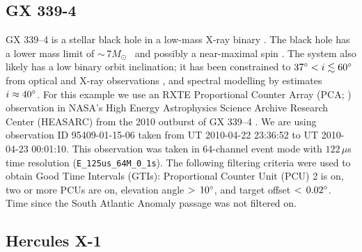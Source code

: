 \documentclass[twocolumn]{aastex62}
\newcommand{\Msun}{\ensuremath{M_\odot}\xspace}
\begin{document}
\subsection{GX 339-4}
\label{sec:gx339}
GX 339--4 is a stellar black hole in a low-mass X-ray binary \citep{Hynesetal03}. 
The black hole has a lower mass limit of $\sim$\,7\Msun\ \citep{MunozDariasetal08} and possibly a near-maximal spin \citep{Ludlametal15}. 
The system also likely has a low binary orbit inclination; it has been constrained to $37 \degree <i\lesssim 60\degree$ from optical and X-ray observations \citep{Heidaetal17, Zdziarskietal98}, and spectral modelling by \citet{WangJietal18} estimates $i\approx 40\degree$.
For this example we use an RXTE Proportional Counter Array (PCA; \citealt{Jahodaetal96}) observation in NASA's High Energy Astrophysics Science Archive Research Center (HEASARC) from the 2010 outburst of GX 339--4 \citep{Yamaokaetal10}.
We are using observation ID 95409-01-15-06 taken from UT 2010-04-22 23:36:52 to UT 2010-04-23 00:01:10.
This observation was taken in 64-channel event mode with $122\,\mu$s time resolution (\texttt{E\_125us\_64M\_0\_1s}).
The following filtering criteria were used to obtain Good Time Intervals (GTIs): Proportional Counter Unit (PCU) 2 is on, two or more PCUs are on, elevation angle $>\,10\degree$, and target offset $<\,0.02\degree$. 
Time since the South Atlantic Anomaly passage was not filtered on. 

\subsection{Hercules X-1}
\label{sec:herx1}
\end{document}
